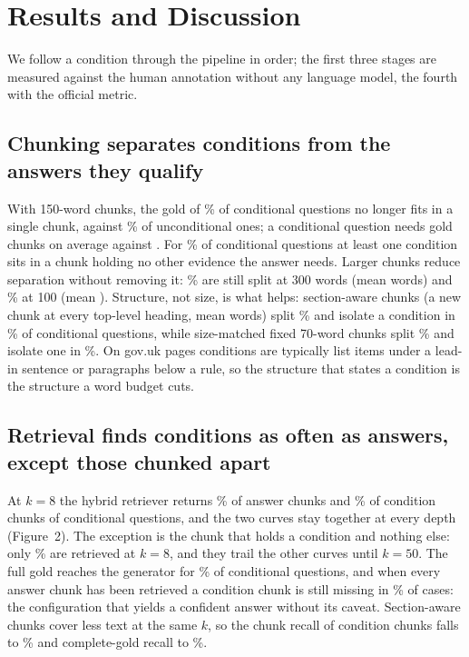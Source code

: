 \section{{Results and Discussion}}

We follow a condition through the pipeline in order; the first three stages are measured against the human annotation without any language model, the fourth with the official metric.

\subsection{Chunking separates conditions from the answers they qualify}
\label{sec:chunking}

With 150-word chunks, the gold of \sepCond\% of conditional questions no longer fits in a single chunk, against \sepUncond\% of unconditional ones; a conditional question needs \goldChunksCond{} gold chunks on average against \goldChunksUncond. For \condOnly\% of conditional questions at least one condition sits in a chunk holding no other evidence the answer needs. Larger chunks reduce separation without removing it: \sepCondThreeHundred\% are still split at 300 words (mean \chunkWordsThreeHundred{} words) and \sepCondHundred\% at 100 (mean \chunkWordsHundred). Structure, not size, is what helps: section-aware chunks (a new chunk at every top-level heading, mean \chunkWordsSection{} words) split \sepCondSection\% and isolate a condition in \condOnlySection\% of conditional questions, while size-matched fixed 70-word chunks split \sepCondSeventy\% and isolate one in \condOnlySeventy\%. On gov.uk pages conditions are typically list items under a lead-in sentence or paragraphs below a rule, so the structure that states a condition is the structure a word budget cuts.

\subsection{Retrieval finds conditions as often as answers, except those chunked apart}
\label{sec:retrieval}

At $k=8$ the hybrid retriever returns \recAnsEight\% of answer chunks and \recCondEight\% of condition chunks of conditional questions, and the two curves stay together at every depth (Figure~2). The exception is the chunk that holds a condition and nothing else: only \recCondOnlyEight\% are retrieved at $k=8$, and they trail the other curves until $k=50$. The full gold reaches the generator for \recAllGoldEight\% of conditional questions, and when every answer chunk has been retrieved a condition chunk is still missing in \recLostGivenAnsEight\% of cases: the configuration that yields a confident answer without its caveat. Section-aware chunks cover less text at the same $k$, so the chunk recall of condition chunks falls to \recCondEightSection\% and complete-gold recall to \recAllGoldEightSection\%.

